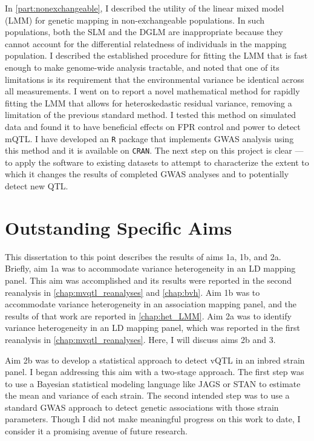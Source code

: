 In \autoref{part:nonexchangeable}, I described the utility of the linear mixed model (LMM) for genetic mapping in non-exchangeable populations.
In such populations, both the SLM and the DGLM are inappropriate because they cannot account for the differential relatedness of individuals in the mapping population.
I described the established procedure for fitting the LMM that is fast enough to make genome-wide analysis tractable, and noted that one of its limitations is its requirement that the environmental variance be identical across all measurements.
I went on to report a novel mathematical method for rapidly fitting the LMM that allows for heteroskedastic residual variance, removing a limitation of the previous standard method.
I tested this method on simulated data and found it to have beneficial effects on FPR control and power to detect mQTL.
I have developed an \texttt{R} package that implements GWAS analysis using this method and it is available on \texttt{CRAN}.
The next step on this project is clear --- to apply the software to existing datasets to attempt to characterize the extent to which it changes the results of completed GWAS analyses and to potentially detect new QTL.


\section{Outstanding Specific Aims}

This dissertation to this point describes the results of aims 1a, 1b, and 2a.
Briefly, aim 1a was to accommodate variance heterogeneity in an LD mapping panel.
This aim was accomplished and its results were reported in the second reanalysis in \autoref{chap:mvqtl_reanalyses} and \autoref{chap:bvh}.
Aim 1b was to accommodate variance heterogeneity in an association mapping panel, and the results of that work are reported in \autoref{chap:het_LMM}.
Aim 2a was to identify variance heterogeneity in an LD mapping panel, which was reported in the first reanalysis in \autoref{chap:mvqtl_reanalyses}.
Here, I will discuss aims 2b and 3.

Aim 2b was to develop a statistical approach to detect vQTL in an inbred strain panel.
I began addressing this aim with a two-stage approach.
The first step was to use a Bayesian statistical modeling language like JAGS or STAN \citep{Plummer2003,Carpenter2017} to estimate the mean and variance of each strain.
The second intended step was to use a standard GWAS approach to detect genetic associations with those strain parameters.
Though I did not make meaningful progress on this work to date, I consider it a promising avenue of future research.

